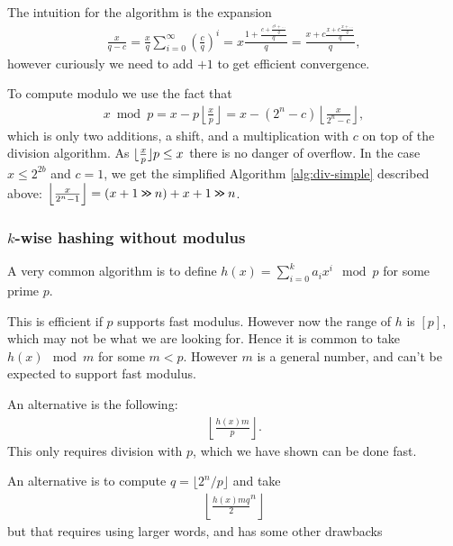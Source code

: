 The intuition for the algorithm is the expansion
\begin{align}
   \frac{x}{q-c}
   = \frac{x}{q}\sum_{i=0}^\infty \left(\frac{c}{q}\right)^i
   = x\frac{1+\frac{c+\frac{c^2 + \dots}{q}}{q}}{q}
   = \frac{x+c\frac{x+c\frac{x + \dots}{q}}{q}}{q},
\end{align}
however curiously we need to add $+1$ to get efficient convergence.









To compute modulo we use the fact that
\begin{align}
   x \bmod p
   = x - p\left\lfloor\frac{x}{p}\right\rfloor
   = x - (2^n - c)\left\lfloor\frac{x}{2^n-c}\right\rfloor,
\end{align}
which is only two additions, a shift, and a multiplication with $c$ on top of the division algorithm.
As $\lfloor {\frac{x}{p}} \rfloor p \le x$ there is no danger of overflow.
In the case $x\le 2^{2b}$ and $c=1$, we get the simplified Algorithm \ref{alg:div-simple} described above: $ \left\lfloor\frac{x}{2^n-1}\right\rfloor = (x+1 \mathbin{\texttt{>\!>}} n)+x+1 \mathbin{\texttt{>\!>}} n$.


\subsubsection{$k$-wise hashing without modulus}

A very common algorithm is to define
$h(x) = \sum_{i=0}^k a_i x^i \mod p$
for some prime $p$.

This is efficient if $p$ supports fast modulus.
However now the range of $h$ is $[p]$, which may not be what we are looking for.
Hence it is common to take $h(x)\mod m$ for some $m<p$.
However $m$ is a general number, and can't be expected to support fast modulus.

An alternative is the following:
\begin{align}
   \left\lfloor\frac{h(x)m}{p}\right\rfloor.
\end{align}
This only requires division with $p$, which we have shown can be done fast.

An alternative is to compute $q = \lfloor2^n/p\rfloor$ and take
\begin{align}
\left\lfloor
   \frac{h(x)mq}2^n
\right\rfloor
\end{align}
but that requires using larger words, and has some other drawbacks
